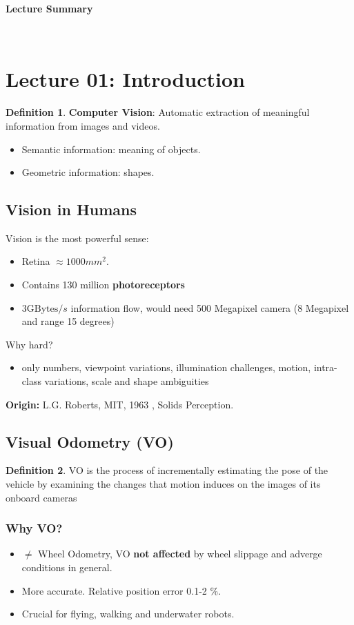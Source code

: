 \documentclass[a4paper,12 pt]{article}
\theoremstyle{definition}
\theoremstyle{remark}
\theoremstyle{definition}
\theoremstyle{definition}
\newtheorem{df}{Definition}
\theoremstyle{definition}
\theoremstyle{remark}
\theoremstyle{definition}
\begin{document}
\begin{huge}{\textbf{Lecture Summary}}\end{huge} \\
\setcounter{section}{1}
\setcounter{secnumdepth}{4}
\setcounter{section}{1}
\setcounter{subsection}{0}

\section*{Lecture 01: Introduction}
\begin{df}
\textbf{Computer Vision}: Automatic extraction of meaningful information from images and videos.
\begin{itemize}
\item Semantic information: meaning of objects.
\item Geometric information: shapes.
\end{itemize}
\end{df}
\subsection*{Vision in Humans}
Vision is the most powerful sense:
\begin{itemize}
\item Retina $\approx 1000mm^2$.
\item Contains 130 million \textbf{photoreceptors}
\item $3\text{GBytes}/s$ information flow, would need 500 Megapixel camera (8 Megapixel and range 15 degrees)
\end{itemize}
Why hard? 
\begin{itemize}
\item only numbers, viewpoint variations, illumination challenges, motion, intra-class variations, scale and shape ambiguities
\end{itemize}
\textbf{Origin:} L.G. Roberts, MIT, 1963 , Solids Perception.
\subsection*{Visual Odometry (VO)}
\begin{df}
VO is the process of incrementally estimating the pose of the vehicle by examining the changes that motion induces on the images of its onboard cameras
\end{df}
\subsubsection*{Why VO?}
\begin{itemize}
\item $\neq$ Wheel Odometry, VO \textbf{not affected} by wheel slippage and adverge conditions in general.
\item More accurate. Relative position error 0.1-2 \%.
\item Crucial for flying, walking and underwater robots.
\end{itemize}
\end{document}
